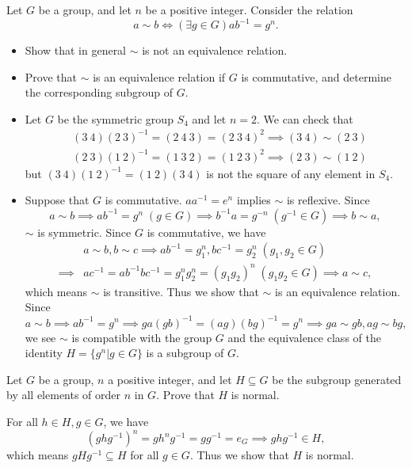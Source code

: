 \documentclass[12pt,letterpaper,boxed]{hmcpset}
\begin{document}
\begin{problem}[7.6]
Let $G$ be a group, and let $n$ be a positive integer. Consider the relation
\[
a\sim b\iff(\exists g\in G)ab^{-1}=g^n.
\]
\begin{itemize}
	\item Show that in general $\sim$ is not an equivalence relation.
	\item Prove that $\sim$ is an equivalence relation if $G$ is commutative, and determine the corresponding subgroup of $G$.
\end{itemize}

\end{problem}
\begin{solution}
\begin{itemize}
	\item Let $G$ be the symmetric group $S_4$ and let $n=2$. We can check that
	\begin{align*}
		&(3\ 4)(2\ 3)^{-1}=(2\ 4\ 3)=(2\ 3\ 4)^2\implies(3\ 4)\sim (2\ 3)\\
		&(2\ 3)(1\ 2)^{-1}=(1\ 3\ 2)=(1\ 2\ 3)^2\implies(2\ 3)\sim (1\ 2)
	\end{align*}
	but $(3\ 4)(1\ 2)^{-1}=(1\ 2)(3\ 4)$ is not the square of any element in $S_4$.
	\item Suppose that $G$ is commutative. $aa^{-1}=e^n$ implies $\sim$ is reflexive. Since
	\[
	a\sim b\implies ab^{-1}=g^n\;(g\in G)\implies b^{-1}a=g^{-n}\;(g^{-1}\in G)\implies b\sim a,
	\]  
	$\sim$ is symmetric. Since $G$ is commutative, we have
	\begin{align*}
		&a\sim b,b\sim c\implies ab^{-1}=g_1^n,bc^{-1}=g_2^n\;(g_1,g_2\in G)\\
		\implies& ac^{-1}=ab^{-1}bc^{-1}=g_1^ng_2^n=(g_1g_2)^n\;(g_1g_2\in G)\implies a\sim c,
	\end{align*}
	which means $\sim$ is transitive. Thus we show that $\sim$ is an equivalence relation. Since
	\[
	a\sim b\implies ab^{-1}=g^n\implies ga(gb)^{-1}=(ag)(bg)^{-1}=g^n\implies ga\sim gb,ag\sim bg,
	\]
	we see $\sim$ is compatible with the group $G$ and the equivalence class of the identity $H=\{g^n|g\in G\}$ is a subgroup of $G$.
\end{itemize}
\end{solution}

\begin{problem}[7.7]
	Let $G$ be a group, $n$ a positive integer, and let $H \subseteq G$ be the subgroup
	generated by all elements of order $n$ in $G$. Prove that $H$ is normal.
\end{problem}
\begin{solution}
	For all $h\in H, g\in G$, we have 
	$$(ghg^{-1})^n=gh^ng^{-1}=gg^{-1}=e_G\implies ghg^{-1}\in H,  $$
	which means $gHg^{-1}\subseteq H$ for all $g\in G$. Thus we show that $H$ is normal.
\end{solution}
\end{document}
